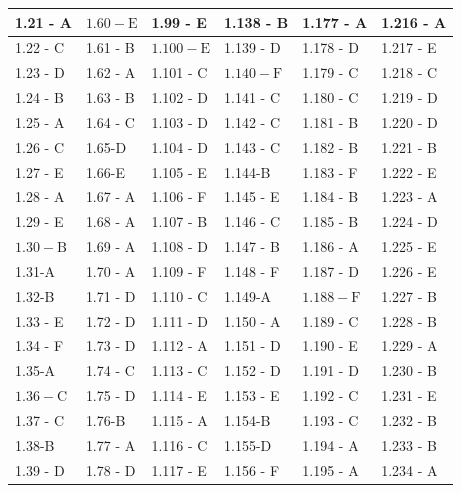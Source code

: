 \documentclass[10pt]{article}
\begin{document}
\begin{center}
\begin{tabular}{|l|l|l|l|l|l|}
\hline
1.21 - A & $1.60-\mathrm{E}$ & 1.99 - E & 1.138 - B & 1.177 - A & 1.216 - A \\
\hline
1.22 - C & 1.61 - B & $1.100-\mathrm{E}$ & 1.139 - D & 1.178 - D & 1.217 - E \\
\hline
1.23 - D & 1.62 - A & 1.101 - C & $1.140-\mathrm{F}$ & 1.179 - C & 1.218 - C \\
\hline
1.24 - B & 1.63 - B & 1.102 - D & 1.141 - C & 1.180 - C & 1.219 - D \\
\hline
1.25 - A & 1.64 - C & 1.103 - D & 1.142 - C & 1.181 - B & 1.220 - D \\
\hline
1.26 - C & 1.65-D & 1.104 - D & 1.143 - C & 1.182 - B & 1.221 - B \\
\hline
1.27 - E & 1.66-E & 1.105 - E & 1.144-B & 1.183 - F & 1.222 - E \\
\hline
1.28 - A & 1.67 - A & 1.106 - F & 1.145 - E & 1.184 - B & 1.223 - A \\
\hline
1.29 - E & 1.68 - A & 1.107 - B & 1.146 - C & 1.185 - B & 1.224 - D \\
\hline
$1.30-\mathrm{B}$ & 1.69 - A & 1.108 - D & 1.147 - B & 1.186 - A & 1.225 - E \\
\hline
1.31-A & 1.70 - A & 1.109 - F & 1.148 - F & 1.187 - D & 1.226 - E \\
\hline
1.32-B & 1.71 - D & 1.110 - C & 1.149-A & $1.188-\mathrm{F}$ & 1.227 - B \\
\hline
1.33 - E & 1.72 - D & 1.111 - D & 1.150 - A & 1.189 - C & 1.228 - B \\
\hline
1.34 - F & 1.73 - D & 1.112 - A & 1.151 - D & 1.190 - E & 1.229 - A \\
\hline
1.35-A & 1.74 - C & 1.113 - C & 1.152 - D & 1.191 - D & 1.230 - B \\
\hline
$1.36-\mathrm{C}$ & 1.75 - D & 1.114 - E & 1.153 - E & 1.192 - C & 1.231 - E \\
\hline
1.37 - C & 1.76-B & 1.115 - A & 1.154-B & 1.193 - C & 1.232 - B \\
\hline
1.38-B & 1.77 - A & 1.116 - C & 1.155-D & 1.194 - A & 1.233 - B \\
\hline
1.39 - D & 1.78 - D & 1.117 - E & 1.156 - F & 1.195 - A & 1.234 - A \\
\hline
\end{tabular}
\end{center}
\end{document}
